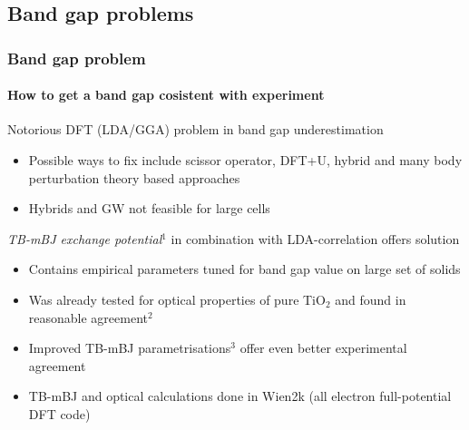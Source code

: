 \documentclass[noamsthm,8pt,t,xcolor={dvipsnames}]{beamer}
\begin{document}
\subsection{Band gap problems}
\begin{frame}
   \frametitle{Band gap problem}
   \framesubtitle{How to get a band gap cosistent with experiment}

   \vspace{-0.2cm}
   Notorious DFT (LDA/GGA) problem in band gap underestimation
   \begin{itemize}
      \item Possible ways to fix include scissor operator, DFT+U, hybrid and many body perturbation theory based approaches
      \item Hybrids and GW not feasible for large cells
   \end{itemize}

   \pause

   \emph{TB-mBJ exchange potential}$^1$ in combination with LDA-correlation offers solution
   \begin{itemize}
      \item<2-> Contains empirical parameters tuned for band gap value on large set of solids 
      \item<3-> Was already tested for optical properties of pure TiO$_2$ and found in reasonable agreement$^2$
      \item<3-> Improved TB-mBJ parametrisations$^3$ offer even better experimental agreement
      \item<3-> TB-mBJ and optical calculations done in Wien2k (all electron full-potential DFT code)
   \end{itemize}

   
\end{frame}
\end{document}
